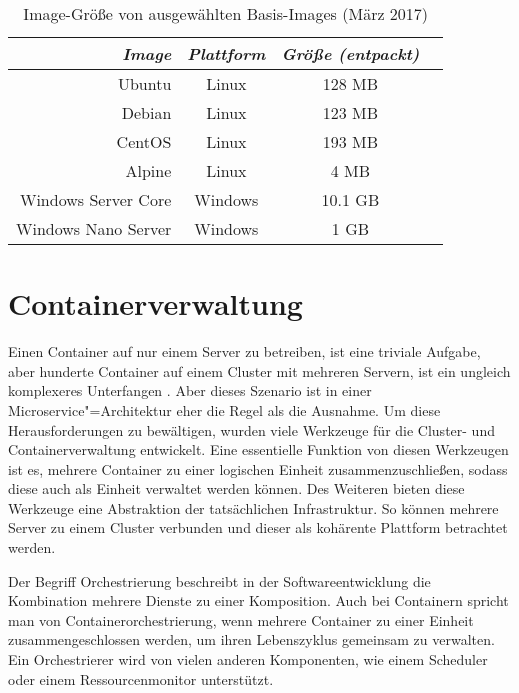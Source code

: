\begin{table}[!hbt]
\caption{Image-Größe von ausgewählten Basis-Images (März 2017)}
\label{tab:docker-image-size}
\centering
\setlength{\tabcolsep}{5mm} %
\def\arraystretch{1.25} %
\begin{tabular}{|r||c|c|c|}
\hline
\emph{Image} & \emph{Plattform} & \emph{Größe (entpackt)} \\
\hline
\hline
Ubuntu & Linux & 128 MB \\
\hline
Debian & Linux & 123 MB \\
\hline
CentOS & Linux & 193 MB \\
\hline
Alpine & Linux & 4 MB \\
\hline
Windows Server Core & Windows & 10.1 GB \\
\hline
Windows Nano Server & Windows & 1 GB \\
\hline
\end{tabular}
\end{table}

\section{Containerverwaltung}

Einen Container auf nur einem Server zu betreiben, ist eine triviale Aufgabe, aber hunderte Container auf einem Cluster mit mehreren Servern, ist ein ungleich komplexeres Unterfangen \cite{RussinovicContainers}. Aber dieses Szenario ist in einer Microservice"=Architektur eher die Regel als die Ausnahme. Um diese Herausforderungen zu bewältigen, wurden viele Werkzeuge für die Cluster- und Containerverwaltung entwickelt. Eine essentielle Funktion von diesen Werkzeugen ist es, mehrere Container zu einer logischen Einheit zusammenzuschließen, sodass diese auch als Einheit verwaltet werden können. Des Weiteren bieten diese Werkzeuge eine Abstraktion der tatsächlichen Infrastruktur. So können mehrere Server zu einem Cluster verbunden und dieser als kohärente Plattform betrachtet werden. 

Der Begriff Orchestrierung beschreibt in der Softwareentwicklung die Kombination mehrere Dienste zu einer Komposition. Auch bei Containern spricht man von Containerorchestrierung, wenn mehrere Container zu einer Einheit zusammengeschlossen werden, um ihren Lebenszyklus gemeinsam zu verwalten. Ein Orchestrierer wird von vielen anderen Komponenten, wie \zB einem Scheduler oder einem Ressourcenmonitor unterstützt. 

